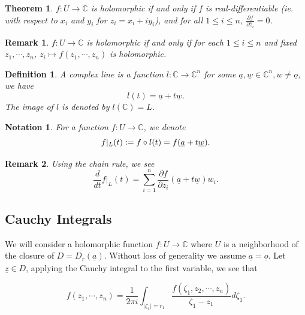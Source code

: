 \documentclass{article}
\newtheorem{theorem}{Theorem} [section]
\newtheorem{definition}{Definition}[section]
\newtheorem{notation}{Notation}[section]
\newtheorem{remark}{Remark}[section]
\newcommand{\defeq}{\vcentcolon=}
\newcommand{\C}[0]{\mathbb{C}}
\newcommand{\pd}[2]{{\frac {\partial#1} {\partial#2}}}
\begin{document}
\begin{theorem}
$f:U\to\C$ is holomorphic if and only if $f$ is real-differentiable (ie. with respect to $x_i$ and $y_i$ for $z_i = x_i+iy_i$), and for all $1\leq i\leq n$, $\pd{f}{\overline{z}_i} = 0$.
\end{theorem}

\begin{remark}
$f:U\to\C$ is holomorphic if and only if for each $1\leq i\leq n$ and fixed $z_1,\cdots,z_n$, $z_i\mapsto f(z_1,\cdots,z_n)$ is holomorphic.
\end{remark}

\begin{definition}
A complex line is a function $l:\C\to\C^n$ for some $\underline{a},\underline{w}\in\C^n,w\not=\underline{o}$, we have
\begin{equation*}
l(t) = \underline{a}+t\underline{w}.
\end{equation*}
The image of $l$ is denoted by $l(\C) = L$.
\end{definition}

\begin{notation}
For a function $f:U\to\C$, we denote \
\begin{equation*}
f|_L(t) \defeq f\circ l(t) = f(\underline{a}+t\underline{w}).
\end{equation*}
\end{notation}

\begin{remark}
Using the chain rule, we see
\begin{equation*}
{\frac d {dt}}f|_L(t) = \sum_{i=1}^n \pd{f}{z_i}(\underline{a}+t\underline{w})w_i.
\end{equation*}
\end{remark}

\subsection{Cauchy Integrals}

We will consider a holomorphic function $f:U\to\C$ where $U$ is a neighborhood of the closure of $D=D_{\underline{r}}(\underline{a})$. Without loss of generality we assume $\underline{a}=\underline{o}$. Let $\underline{z}\in D$, applying the Cauchy integral to the first variable, we see that

\begin{equation*}
f(z_1,\cdots,z_n) = {\frac 1 {2\pi i}}\int_{\vert \zeta_1\vert = r_1}{\frac {f(\zeta_1,z_2,\cdots,z_n)} {\zeta_1-z_1}}d\zeta_1.
\end{equation*}
\end{document}
